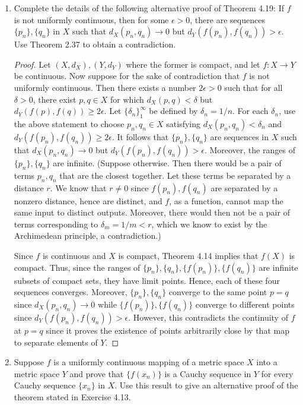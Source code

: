 \documentclass[../psets.tex]{subfiles}
\begin{document}
\begin{enumerate}[label={\textbf{\arabic*.}}]
    \item Complete the details of the following alternative proof of Theorem 4.19: If $f$ is not uniformly continuous, then for some $\epsilon>0$, there are sequences $\{p_n\},\{q_n\}$ in $X$ such that $d_X(p_n,q_n)\to 0$ but $d_Y(f(p_n),f(q_n))>\epsilon$. Use Theorem 2.37 to obtain a contradiction.
    \begin{proof}
        Let $(X,d_X),(Y,d_Y)$ where the former is compact, and let $f:X\to Y$ be continuous. Now suppose for the sake of contradiction that $f$ is not uniformly continuous. Then there exists a number $2\epsilon>0$ such that for all $\delta>0$, there exist $p,q\in X$ for which $d_X(p,q)<\delta$ but $d_Y(f(p),f(q))\geq 2\epsilon$. Let $\{\delta_n\}_1^\infty$ be defined by $\delta_n=1/n$. For each $\delta_n$, use the above statement to choose $p_n,q_n\in X$ satisfying $d_X(p_n,q_n)<\delta_n$ and $d_Y(f(p_n),f(q_n))\geq 2\epsilon$. It follows that $\{p_n\},\{q_n\}$ are sequences in $X$ such that $d_X(p_n,q_n)\to 0$ but $d_Y(f(p_n),f(q_n))>\epsilon$. Moreover, the ranges of $\{p_n\},\{q_n\}$ are infinite. (Suppose otherwise. Then there would be a pair of terms $p_n,q_n$ that are the closest together. Let these terms be separated by a distance $r$. We know that $r\neq 0$ since $f(p_n),f(q_n)$ are separated by a nonzero distance, hence are distinct, and $f$, as a function, cannot map the same input to distinct outputs. Moreover, there would then not be a pair of terms corresponding to $\delta_m=1/m<r$, which we know to exist by the Archimedean principle, a contradiction.)\par
        Since $f$ is continuous and $X$ is compact, Theorem 4.14 implies that $f(X)$ is compact. Thus, since the ranges of $\{p_n\},\{q_n\},\{f(p_n)\},\{f(q_n)\}$ are infinite subsets of compact sets, they have limit points. Hence, each of these four sequences converges. Moreover, $\{p_n\},\{q_n\}$ converge to the same point $p=q$ since $d_X(p_n,q_n)\to 0$ while $\{f(p_n)\},\{f(q_n)\}$ converge to different points since $d_Y(f(p_n),f(q_n))>\epsilon$. However, this contradicts the continuity of $f$ at $p=q$ since it proves the existence of points arbitrarily close by that map to separate elements of $Y$.
    \end{proof}
    \item Suppose $f$ is a uniformly continuous mapping of a metric space $X$ into a metric space $Y$ and prove that $\{f(x_n)\}$ is a Cauchy sequence in $Y$ for every Cauchy sequence $\{x_n\}$ in $X$. Use this result to give an alternative proof of the theorem stated in Exercise 4.13.

\end{enumerate}
\end{document}
